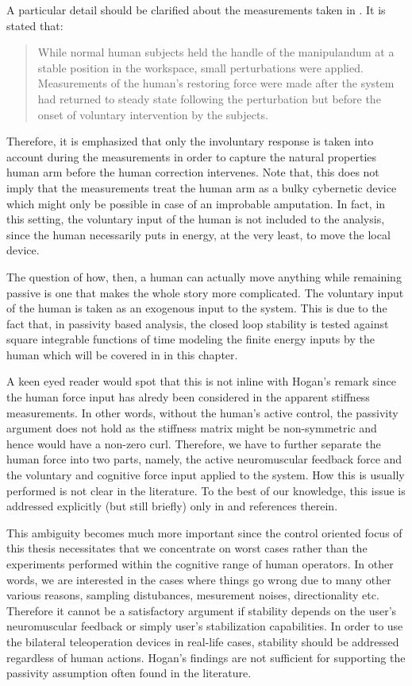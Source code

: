 \begin{rem}
A particular detail should be clarified about the measurements taken in \cite{hogan89}. It is stated that: 
\begin{quote}
While normal human subjects held the handle of the manipulandum at a stable position
in the workspace, small perturbations were applied. Measurements
of the human's restoring force were made after the system
had returned to steady state following the perturbation but before
the onset of voluntary intervention by the subjects.
\end{quote}
Therefore, it is emphasized that only the involuntary response is taken into account during the measurements in order to
capture the natural properties human arm before the human correction intervenes. Note that, this does not imply that the
measurements treat the human arm as a bulky cybernetic device which might only be possible in case of an improbable amputation.
In fact, in this setting, the voluntary input of the human is not included to the analysis, since the human necessarily puts in
energy, at the very least, to move the local device. 
\end{rem}

The question of how, then, a human can actually move anything while remaining passive is one that makes the whole 
story more complicated. The voluntary input of the human is taken as an exogenous input to the system. This is due to the 
fact that, in passivity based analysis, the closed loop stability is tested against square integrable functions of time 
modeling the finite energy inputs by the human which will be covered in  in this chapter.  

A keen eyed reader would spot that this is not inline with Hogan's remark since the human force input has 
alredy been considered in the apparent stiffness measurements. In other words, without the human's active control, the passivity 
argument does not hold as the stiffness matrix might be non-symmetric and hence would have a non-zero curl. Therefore, we have to further
separate the human force into two parts, namely, the active neuromuscular feedback force and the voluntary and cognitive force 
input applied to the system. How this is usually performed is not clear in the literature. To the best of our knowledge, this 
issue is addressed explicitly (but still briefly) only in \cite[Sec. II.B]{kazeroonitsay} and references therein.

This ambiguity becomes much more important since the control oriented focus of this thesis necessitates that we concentrate on
worst cases rather than the experiments performed within the cognitive range of human operators. In other words, we are interested in
the cases where things go wrong due to many other various reasons, sampling distubances, mesurement noises, directionality etc. Therefore
it cannot be a satisfactory argument if stability depends on the user's neuromuscular feedback or simply user's stabilization capabilities. 
In order to use the bilateral teleoperation devices in real-life cases, stability should be addressed regardless of human actions. Hogan's 
findings are not sufficient for supporting the passivity assumption often found in the literature. 


